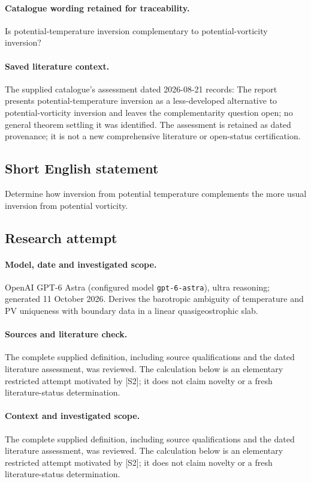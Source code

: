 \documentclass[11pt]{article}
\begin{document}
\paragraph{Catalogue wording retained for traceability.}
Is potential-temperature inversion complementary to potential-vorticity inversion?

\paragraph{Saved literature context.} The supplied catalogue's assessment dated 2026-08-21 records: The report presents potential-temperature inversion as a less-developed alternative to potential-vorticity inversion and leaves the complementarity question open; no general theorem settling it was identified. The assessment is retained as dated provenance; it is not a new comprehensive literature or open-status certification.
\subsection{Short English statement}
Determine how inversion from potential temperature complements the more usual inversion from potential vorticity.
\subsection{Research attempt}
\paragraph{Model, date and investigated scope.}
OpenAI GPT-6 Astra (configured model \texttt{gpt-6-astra}), ultra reasoning; generated 11 October 2026. Derives the barotropic ambiguity of temperature and PV uniqueness with boundary data in a linear quasigeostrophic slab.

\paragraph{Sources and literature check.}
The complete supplied definition, including source qualifications and the dated literature assessment, was reviewed. The calculation below is an elementary restricted attempt motivated by [S2]; it does not claim novelty or a fresh literature-status determination.

\paragraph{Context and investigated scope.} The complete supplied definition, including source qualifications and the dated literature assessment, was reviewed. The calculation below is an elementary restricted attempt motivated by [S2]; it does not claim novelty or a fresh literature-status determination.
\end{document}
